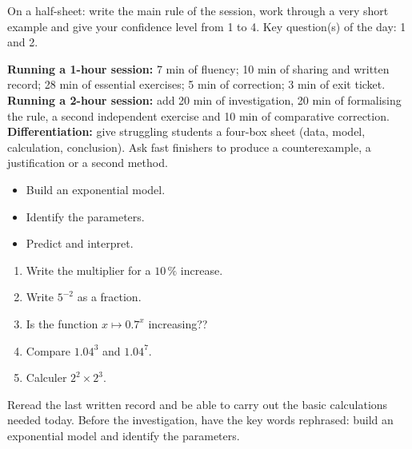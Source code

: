 \begin{sortie}On a half-sheet: write the main rule of the session, work through a very short example and give your confidence level from 1 to 4. Key question(s) of the day: 1 and 2.\end{sortie}

\ifprof
\begin{methode}
\textbf{Running a 1-hour session:} 7 min of fluency; 10 min of sharing and written record; 28 min of essential exercises; 5 min of correction; 3 min of exit ticket.\\
\textbf{Running a 2-hour session:} add 20 min of investigation, 20 min of formalising the rule, a second independent exercise and 10 min of comparative correction.\\
\textbf{Differentiation:} give struggling students a four-box sheet (data, model, calculation, conclusion). Ask fast finishers to produce a counterexample, a justification or a second method.
\end{methode}
\fi
{}
\begin{objectifs}\begin{itemize}\item Build an exponential model.\item Identify the parameters.\item Predict and interpret.\end{itemize}\end{objectifs}
\begin{automatismes}\begin{enumerate}\item Write the multiplier for a $10\,\%$ increase. \item Write $5^{-2}$ as a fraction. \item Is the function $x\mapsto0.7^x$ increasing?? \item Compare $1.04^3$ and $1.04^7$. \item Calculer $2^2\times2^3$. \end{enumerate}\end{automatismes}
\begin{prerequis}Reread the last written record and be able to carry out the basic calculations needed today. Before the investigation, have the key words rephrased: build an exponential model and identify the parameters.\end{prerequis}

